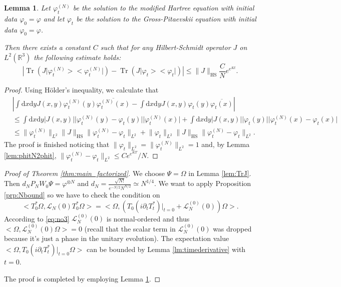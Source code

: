 \documentclass[11pt,a4paper,DIV11]{scrartcl}	%
\newtheorem{lem}[thm]{Lemma}
\newcommand{\di}{\textrm{d}}		%
\newcommand{\Lcal}{\mathcal{L}}		%
\newcommand{\Ncal}{\mathcal{N}}		%
\newcommand{\scal}[2]{\big<#1,#2\big>} %
\newcommand{\cc}[1]{\overline{#1}}	%
\newcommand{\Rbb}{\mathbb{R}}		%
\newcommand{\norm}[1]{\lVert#1\rVert}	%
\newcommand{\ph}{\varphi_t^{(N)}}	%
\newcommand{\project}[1]{\lvert #1 \big>\big< #1\rvert}	%
\newcommand{\Tr}{\operatorname{Tr}}	%
\newcommand{\bd}{\begin{displaymath}}			%
\newcommand{\ed}{\end{displaymath}}
\begin{document}
\begin{lem}
\label{lem:phNtoph}
Let $\ph$ be the solution to the modified Hartree equation with initial data $\varphi_0 = \varphi$ and let $\varphi_t$ be the solution to the Gross-Pitaevskii equation with initial data $\varphi_0 = \varphi$.

Then there exists a constant $C$ such that for any Hilbert-Schmidt operator $J$ on $L^2(\Rbb^3)$ the following estimate holds:
\bd
\left\lvert \Tr\left(J \project{\ph}\right) - \Tr\left(J \project{\varphi_t}\right) \right\rvert \leq \norm{J}_{\textrm{HS}} \frac{C}{N} e^{e^{Kt}}.
\ed
\end{lem}
\begin{proof}
Using H\"older's inequality, we calculate that
\begin{align*}
& \left\lvert \int \di x \di y J(x,y) \ph(y) \cc{\ph(x)} - \int \di x\di y J(x,y) \varphi_t(y) \cc{\varphi_t(x)} \right\rvert \\ 
& \leq \int \di x \di y \lvert J(x,y)\rvert \lvert \ph(y) - \varphi_t(y)\rvert \lvert \ph(x)\rvert + \int \di x \di y \lvert J(x,y) \rvert \lvert \varphi_t(y)\rvert \lvert \ph(x)-\varphi_t(x)\rvert \\
& \leq \norm{\ph}_{L^2} \norm{J}_{\textrm{HS}} \norm{\ph - \varphi_t}_{L^2} + \norm{\varphi_t}_{L^2} \norm{J}_{\textrm{HS}} \norm{\ph - \varphi_t}_{L^2}. 
\end{align*}
The proof is finished noticing that $\norm{\varphi_t}_{L^2} = \norm{\ph}_{L^2} = 1$ and, by Lemma \ref{lem:phitN2phit}, $\norm{\ph - \varphi_t}_{L^2} \leq C e^{e^{KT}}/N$.
\end{proof}

\begin{proof}[Proof of Theorem \ref{thm:main_factorized}]
We choose $\Psi = \Omega$ in Lemma \ref{lem:TrJ}. Then $d_N P_N W_0 \Psi = \varphi^{\otimes N}$ and $d_N = \frac{\sqrt{N!}}{e^{-N/2}N^{N/2}} \simeq N^{1/4}$.
We want to apply Proposition \ref{prp:Nbound} %
so we have to check the condition on 
\bd
\scal{T^\ast_0 \Omega}{\Lcal_N(0)T^\ast_0 \Omega} = \scal{\Omega}{\left(T_0(i\partial_t T^\ast_t)\rvert_{t=0} + \Lcal_N^{(0)}(0)\right)\Omega}.
\ed
According to \eqref{eq:no3} $\Lcal_N^{(0)}(0)$ is normal-ordered and thus $\scal{\Omega}{\Lcal_N^{(0)}(0)\Omega} = 0$ (recall that the scalar term in $\Lcal_N^{(0)}(0)$ was dropped because it's just  a phase in the unitary evolution). The expectation value $\scal{\Omega}{T_0(i\partial_t T^\ast_t)\rvert_{t=0} \Omega}$ can be bounded by Lemma \ref{lm:timederivative} with $t=0$.

The proof is completed by employing Lemma \ref{lem:phNtoph}.
\end{proof}
\end{document}
